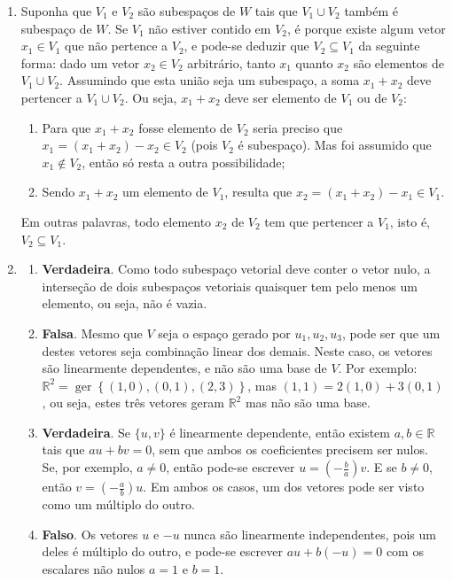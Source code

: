 \documentclass[12pt,a4paper]{article}
\newcommand*\ger[1]{\operatorname{ger}\left\{#1\right\}}
\newcommand*\R{\mathbb{R}}
\begin{document}
\begin{enumerate}
\item Suponha que $V_1$ e $V_2$ são subespaços de $W$ tais que $V_1 \cup V_2$ também é subespaço de $W$. Se $V_1$ não estiver contido em $V_2$, é porque existe algum vetor $x_1 \in V_1$ que não pertence a $V_2$, e pode-se deduzir que $V_2 \subseteq V_1$ da seguinte forma: dado um vetor $x_2 \in V_2$ arbitrário, tanto $x_1$ quanto $x_2$ são elementos de $V_1 \cup V_2$. Assumindo que esta união seja um subespaço, a soma $x_1 + x_2$ deve pertencer a $V_1 \cup V_2$. Ou seja, $x_1 + x_2$ deve ser elemento de $V_1$ ou de $V_2$:
\begin{enumerate}
\item Para que $x_1 + x_2$ fosse elemento de $V_2$ seria preciso que $x_1 = (x_1 + x_2) - x_2 \in V_2$ (pois $V_2$ é subespaço). Mas foi assumido que $x_1 \not \in V_2$, então só resta a outra possibilidade;
\item Sendo $x_1 + x_2$ um elemento de $V_1$, resulta que $x_2 = (x_1 + x_2) - x_1 \in V_1$.
\end{enumerate}
Em outras palavras, todo elemento $x_2$ de $V_2$ tem que pertencer a $V_1$, isto é, $V_2 \subseteq V_1$.


\item
\begin{enumerate}
\item \textbf{Verdadeira}. Como todo subespaço vetorial deve conter o vetor nulo, a interseção de dois subespaços vetoriais quaisquer tem pelo menos um elemento, ou seja, não é vazia.
\item \textbf{Falsa}. Mesmo que $V$ seja o espaço gerado por ${ u_1, u_2, u_3 }$, pode ser que um destes vetores seja combinação linear dos demais. Neste caso, os vetores são linearmente dependentes, e não são uma base de $V$. Por exemplo: $\R^2 = \ger{(1,0),(0,1),(2,3)}$, mas $(1,1) = 2(1,0)+3(0,1)$, ou seja, estes três vetores geram $\R^2$ mas não são uma base.
\item \textbf{Verdadeira}. Se $\{u, v\}$ é linearmente dependente, então existem $a,b \in \R$ tais que $au+bv = 0$, sem que ambos os coeficientes precisem ser nulos. Se, por exemplo, $a \neq 0$, então pode-se escrever $u = (-\frac{b}{a}) v$. E se $b \neq 0$, então $v = (-\frac{a}{b}) u$. Em ambos os casos, um dos vetores pode ser visto como um múltiplo do outro.

\item \textbf{Falso}. Os vetores $u$ e $-u$ nunca são linearmente independentes, pois um deles é múltiplo do outro, e pode-se escrever $au + b(-u) = 0$ com os escalares não nulos $a=1$ e $b=1$.


\end{enumerate}
\end{enumerate}
\end{document}
